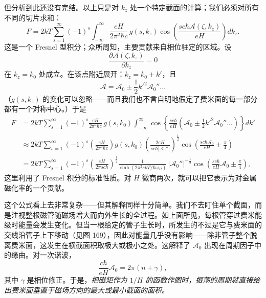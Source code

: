 但分析到此还没有完结。以上只是对 $k_{z}$ 处一个特定截面的计算；我们必须对所有不同的切片求和：
\begin{equation*}
F=2kT\sum_{s=1}^{\infty}(-1)^{s}\int_{-\infty}^{\infty}\frac{eH}{2\pi^{2}\hbar c}\,g(s,k_{z})\cos\left(\frac{sc\hbar\mathcal{A}(\zeta,k_{z})}{eH}\right)dk_{z}.
\tag{9.89}
\end{equation*}
这是一个 Fresnel 型积分；众所周知，主要贡献来自相位驻定的区域。设
\begin{equation*}
\frac{\partial\mathcal{A}(\zeta,k_{z})}{\partial k_{z}}=0
\tag{9.90}
\end{equation*}
在 $k_{z}=k_{0}$ 处成立。在该点附近展开：$k_{z}=k_{0}+k'$，且
\begin{equation*}
\mathcal{A}=\mathcal{A}_{0}\pm\frac{1}{2}k'^{2}\mathcal{A}_{0}''\dots
\tag{9.91}
\end{equation*}
（$g(s,k_{z})$ 的变化可以忽略——而且我们也不言自明地假定了费米面的每一部分都有一个对称中心。）于是
\begin{align*}
F&=2kT\sum_{s=1}^{\infty}(-1)^{s}\frac{eH}{2\pi^{2}\hbar c}\,g(s,k_{0})\int_{-\infty}^{\infty}\cos\left\{\frac{sc\hbar}{eH}\left(\mathcal{A}_{0}\pm\frac{1}{2}k'^{2}\mathcal{A}_{0}''\dots\right)\right\}dk'\\
&\approx 2kT\sum_{s=1}^{\infty}(-1)^{s}\left(\frac{eH}{2\pi^{2}\hbar c}\right)g(s,k_{0})\left(\frac{2eH}{sc\hbar|\mathcal{A}_{0}''|}\right)^{\frac{1}{2}}\cos\left(\frac{sc\hbar\mathcal{A}_{0}}{eH}\pm\frac{\pi}{4}\right)\\
&=2kT\sum_{s=1}^{\infty}(-1)^{s}\left(\frac{eH}{2\pi sc\hbar}\right)^{\frac{1}{2}}\frac{1}{\sinh\left(2\pi^{2}skT/\hbar\omega_{H}\right)}\,|\mathcal{A}_{0}''|^{-\frac{1}{2}}\cos\left(\frac{sc\hbar}{eH}\mathcal{A}_{0}\pm\frac{\pi}{4}\right),
\tag{9.92}
\end{align*}
这里利用了 Fresnel 积分的标准性质。对 $H$ 微商两次，就可以把它表示为对金属磁化率的一个贡献。

这个公式看上去非常复杂——但其解释同样十分简单。我们不去盯住单个截面，而是注视整根磁管随磁场增大而向外生长的全过程。如上面所见，每根管穿过费米能级时能量会发生变化。但当一根给定的管子生长时，所发生的不过是它与费米面的交线沿管子上下移动（见图 169），因此对能量几乎没有影响——除非管子整个脱离费米面，这发生在横截面积取极大或极小之处。这解释了 $\mathcal{A}_{0}$ 出现在周期因子中的缘由。对一次谐波，
\begin{equation*}
\frac{c\hbar}{eH}\mathcal{A}_{0}=2\pi(n+\gamma),
\tag{9.93}
\end{equation*}
其中 $\gamma$ 是相位修正。于是，\emph{把磁矩作为 $1/H$ 的函数作图时，振荡的周期就直接给出费米面垂直于磁场方向的最大或最小截面的面积。}

